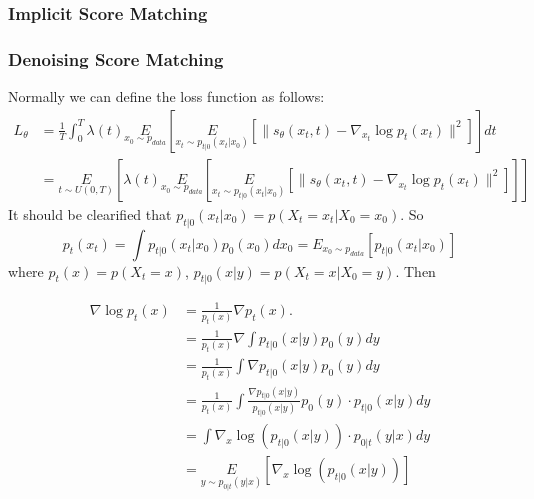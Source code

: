\subsubsection{Implicit Score Matching}
\subsubsection{Denoising Score Matching}
Normally we can define the loss function as follows:
\begin{equation}
    \begin{aligned}
        L_\theta & = \frac{1}{T}\int_0^T\lambda(t)\underset{x_0\sim p_{data}}{E}\left[\underset{x_t\sim p_{t|0}(x_t|x_0)}{E}\left[\|s_\theta(x_t, t)-\nabla_{x_t}\log p_t(x_t)\|^2\right]\right]dt\\
        &=\underset{t\sim U(0, T)}{E}\left[\lambda(t)\underset{x_0\sim p_{data}}{E}\left[\underset{x_t\sim p_{t|0}(x_t|x_0)}{E}\left[\|s_\theta(x_t, t)-\nabla_{x_t}\log p_t(x_t)\|^2\right]\right]\right]
    \end{aligned}
\end{equation}
It should be clearified that $p_{t|0}(x_t|x_0)=p(X_t=x_t|X_0=x_0)$. So $$p_t(x_t)=\int p_{t|0}(x_t|x_0)p_0(x_0)dx_0=E_{x_0\sim p_{data}}\left[p_{t|0}(x_t|x_0)\right]$$
where $p_{t}(x)=p\left(X_{t}=x\right)$, $p_{t | 0}(x | y)=p\left(X_{t}=x | X_{0}=y\right)$. Then

\begin{equation}
    \begin{aligned}
    \nabla \log p_{t}(x) & =\frac{1}{p_{t}(x)} \nabla p_{t}(x) . \\
    & =\frac{1}{p_{t}(x)} \nabla \int p_{t | 0}(x | y) p_{0}(y) d y \\
    & =\frac{1}{p_{t}(x)} \int \nabla p_{t | 0}(x | y) p_{0}(y) d y \\
    & =\frac{1}{p_{t}(x)} \int \frac{\nabla p_{t | 0}(x | y)}{p_{t | 0}(x | y)} p_{0}(y) \cdot p_{t | 0}(x | y) d y \\
    & =\int \nabla_{x} \log \left(p_{t | 0}(x | y)\right) \cdot p_{0 | t}(y | x) d y \\
    & =\underset{y\sim p_{0|t}(y|x)}{E}\left[\nabla_{x} \log \left(p_{t | 0}(x | y)\right)\right]
    \end{aligned}
\end{equation}

